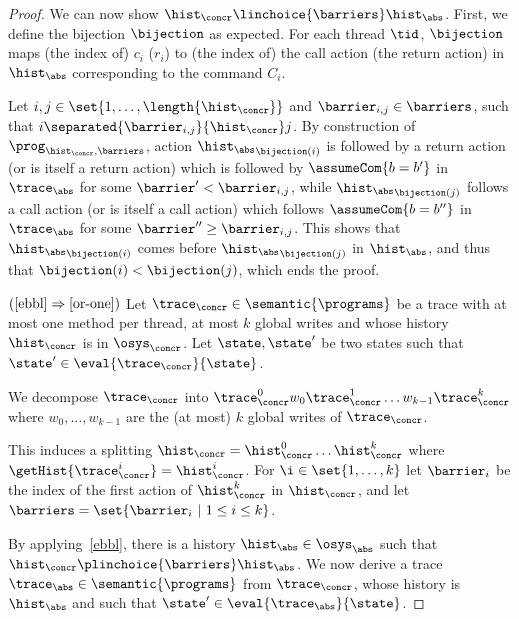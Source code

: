 \begin{proof}
We can now show $\hist_\concr \linchoice{\barriers} \hist_\abs$. First, we 
define the bijection $\bijection$ as expected. For each thread $\tid$, 
$\bijection$ maps (the index of) $c_i$ (\resp $r_i$) to (the index of) the call
action (\resp the return action) in $\hist_\abs$ corresponding to the command 
$C_i$.

Let $i,j \in \set{1,\dots,\length{\hist_\concr}}$ and 
$\barrier_{i,j} \in \barriers$, such that 
$i \separated{\barrier_{i,j}}{\hist_\concr} j$. By construction of 
$\prog_{\hist_\concr,\barriers}$, action ${\hist_\abs}_{\bijection(i)}$ is 
followed by a return action (or is itself a return action) which is followed 
by $\assumeCom{b = b'}$ in $\trace_\abs$ for some 
$\barrier' < \barrier_{i,j}$, while ${\hist_\abs}_{\bijection(j)}$ follows a
call action (or is itself a call action) which follows
$\assumeCom{b = b''}$ in $\trace_\abs$ for some 
$\barrier'' \geq \barrier_{i,j}$. This shows that 
${\hist_\abs}_{\bijection(i)}$ comes before ${\hist_\abs}_{\bijection(j)}$
in $\hist_\abs$, and thus that $\bijection(i) < \bijection(j)$, which ends the 
proof.

$(\ref{ebbl} \Rightarrow \ref{or-one})$
Let $\trace_\concr \in \semantic{\programs}$ be a trace with at most one 
method per thread, at most $k$ global writes and 
whose history $\hist_\concr$ is in $\osys_\concr$. Let $\state,\state'$ be two
states such that $\state' \in \eval{\trace_\concr}{\state}$.

We decompose $\trace_\concr$ into 
$\trace_\concr^0 w_0 \trace_\concr^1 \dots w_{k-1} \trace_\concr^{k}$ where 
$w_0,\dots,w_{k-1}$ are the (at most) $k$ global writes of $\trace_\concr$.

This induces a splitting
$\hist_\concr = \hist_\concr^0 \dots \hist_\concr^k$ where 
$\getHist{\trace_\concr^i} = \hist_\concr^i$. For $\i \in \set{1,\dots,k}$
let $\barrier_i$ be the index of the first action of $\hist_\concr^k$ in 
$\hist_\concr$, and let 
$\barriers = \set{\barrier_i\ |\ 1 \leq i \leq k}$.

By applying~\ref{ebbl}, there is a history $\hist_\abs \in \osys_\abs$
such that $\hist_\concr \plinchoice{\barriers} \hist_\abs$. We now derive a 
trace $\trace_\abs \in \semantic{\programs}$ from $\trace_\concr$, whose 
history is $\hist_\abs$ and such that $\state' \in \eval{\trace_\abs}{\state}$.

\end{proof}

